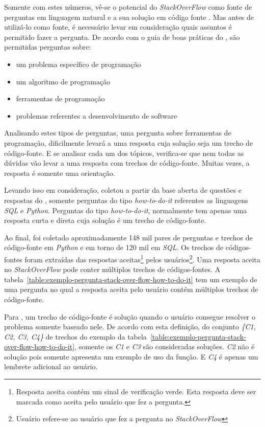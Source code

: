 Somente com estes números, vê-se o potencial do \textit{StackOverFlow} como fonte de perguntas em linguagem natural e a sua solução em código fonte \cite{yao-2018}. Mas antes de utilizá-lo como fonte, é necessário levar em consideração quais assuntos é permitido fazer a pergunta. De acordo com o guia de boas práticas do \cite{stackoverflow-questions-topics-2019}, são permitidas perguntas sobre:

\begin{itemize}
    \item um problema específico de programação
    \item um algoritmo de programação
    \item ferramentas de programação
    \item problemas referentes a desenvolvimento de software
\end{itemize}

Analisando estes tipos de perguntas, uma pergunta sobre ferramentas de programação, dificilmente levará a uma resposta cuja solução seja um trecho de código-fonte. E se analisar cada um dos tópicos, verifica-se que nem todas as dúvidas vão levar a uma resposta com trechos de código-fonte. Muitas vezes, a resposta é somente uma orientação.

Levando isso em consideração, \citeauthor{yao-2018} coletou a partir da base aberta de questões e respostas do \cite{stackoverflow-questions-topics-2019}, somente perguntas do tipo \textit{how-to-do-it} referentes as linguagens \textit{SQL} e \textit{Python}. Perguntas do tipo \textit{how-to-do-it}, normalmente tem apenas uma resposta curta e direta cuja solução é um trecho de código-fonte. 

Ao final, foi coletado aproximadamente 148 mil pares de perguntas e trechos de código-fonte em \emph{Python} e em torno de 120 mil em \emph{SQL}. Os trechos de códigos-fontes foram extraídas das respostas aceitas\footnote{Resposta aceita contém um sinal de verificação verde. Esta resposta deve ser marcada como aceita pelo usuário que fez a pergunta.} pelos usuários\footnote{Usuário refere-se ao usuário que fez a pergunta no \textit{StackOverFlow}}. Uma resposta aceita no \textit{StackOverFlow} pode conter múltiplos trechos de códigos-fontes. A tabela~\ref{table:exemplo-pergunta-stack-over-flow-how-to-do-it} tem um exemplo de uma pergunta no qual a resposta aceita pelo usuário contém múltiplos trechos de código-fonte.

Para \cite{yao-2018}, um trecho de código-fonte é solução quando o usuário consegue resolver o problema somente baseado nele.
De acordo com esta definição, do conjunto \emph{\{C1, C2, C3, C4\}} de trechos do exemplo da tabela~\ref{table:exemplo-pergunta-stack-over-flow-how-to-do-it}, somente os \emph{C1} e \emph{C3} são consideradas soluções. \emph{C2} não é solução pois somente apresenta um exemplo de uso da função. E \emph{C4} é apenas um lembrete adicional ao usuário.

